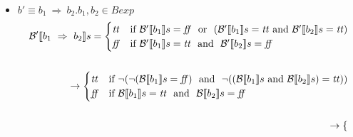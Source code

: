 {\begin{enumerate}[label=(\alph*)]
\begin{itemize}
\begin{align*}
      \rightarrow
      \begin{cases} 
      \semtrue & 
      \mbox{if} \ \lnot ( \lnot ( \lnot (\A{a_1} \leq \A{a_2}))  \ \mbox{ and } \ \lnot (\A{a_1} = \A{a_2}))\\ 
      \semfalse & 
      \mbox{if} \  (\A{a_1} \leq \A{a_2})  \ \mbox{ and } \ \lnot (\A{a_1} = \A{a_2})\\
      \end{cases} \\ \\ 
      \rightarrow
      \begin{cases} 
      \semtrue & 
      \mbox{if} \ \lnot ( (\A{a_1} \leq \A{a_2})  \ \mbox{ and } \ \lnot (\A{a_1} = \A{a_2}))\\ 
      \semfalse & 
      \mbox{if} \  (\A{a_1} \leq \A{a_2})  \ \mbox{ and } \ \lnot (\A{a_1} = \A{a_2})\\
      \end{cases} \\ \\ 
    \end{align*} 
    \item $ b' \equiv b_1 \ \Rightarrow \ b_2. b_1, b_2 \in Bexp $ \\
    \begin{align*}
      \Bext{b_1 \ \Rightarrow \ b_2} = 
      \begin{cases} 
      \semtrue & 
      \mbox{if} \ \Bext{b_1} = \semfalse \ \mbox{ or } \
                (\Bext{b_1} = \semtrue \ \mbox{and} \ \Bext{b_2} = \semtrue)\\ 
      \semfalse & 
      \mbox{if} \ \Bext{b_1} = \semtrue \ \mbox{ and } \ 
                \Bext{b_2} = \semfalse \\ 
      \end{cases} \\ \\  
      \rightarrow
      \begin{cases} 
      \semtrue & 
      \mbox{if} \ \lnot ( \lnot (\B{b_1} = \semfalse) 
                \ \mbox{ and } \
                \lnot ((\B{b_1} \ \mbox{and} \ \B{b_2}) = \semtrue))\\ 
      \semfalse & 
      \mbox{if} \ \B{b_1} = \semtrue \ \mbox{ and } \ 
                \B{b_2} = \semfalse \\ 
      \end{cases}  \\ \\ 
      \rightarrow
      \begin{cases} 

\end{cases}
\end{align*}
\end{itemize}
\end{enumerate}}
